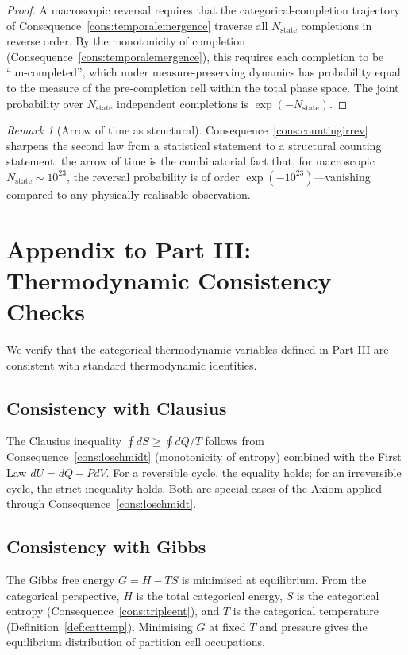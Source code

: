 \documentclass[11pt,twocolumn,a4paper]{article}
\theoremstyle{axiomstyle}
\theoremstyle{conseqstyle}
\theoremstyle{definition}
\theoremstyle{remark}
\newtheorem*{remark}{Remark}
\begin{document}
\begin{proof}
A macroscopic reversal requires that the categorical-completion trajectory of Consequence~\ref{cons:temporalemergence} traverse all $N_{\mathrm{state}}$ completions in reverse order. By the monotonicity of completion (Consequence~\ref{cons:temporalemergence}), this requires each completion to be ``un-completed'', which under measure-preserving dynamics has probability equal to the measure of the pre-completion cell within the total phase space. The joint probability over $N_{\mathrm{state}}$ independent completions is $\exp(-N_{\mathrm{state}})$.
\end{proof}

\begin{remark}[Arrow of time as structural]
Consequence~\ref{cons:countingirrev} sharpens the second law from a statistical statement to a structural counting statement: the arrow of time is the combinatorial fact that, for macroscopic $N_{\mathrm{state}}\sim 10^{23}$, the reversal probability is of order $\exp(-10^{23})$---vanishing compared to any physically realisable observation.
\end{remark}

\section*{Appendix to Part III: Thermodynamic Consistency Checks}

We verify that the categorical thermodynamic variables defined in Part III are consistent with standard thermodynamic identities.

\subsection{Consistency with Clausius}

The Clausius inequality $\oint dS\ge\oint dQ/T$ follows from Consequence~\ref{cons:loschmidt} (monotonicity of entropy) combined with the First Law $dU=dQ-PdV$. For a reversible cycle, the equality holds; for an irreversible cycle, the strict inequality holds. Both are special cases of the Axiom applied through Consequence~\ref{cons:loschmidt}.

\subsection{Consistency with Gibbs}

The Gibbs free energy $G=H-TS$ is minimised at equilibrium. From the categorical perspective, $H$ is the total categorical energy, $S$ is the categorical entropy (Consequence~\ref{cons:tripleent}), and $T$ is the categorical temperature (Definition~\ref{def:cattemp}). Minimising $G$ at fixed $T$ and pressure gives the equilibrium distribution of partition cell occupations.
\end{document}
